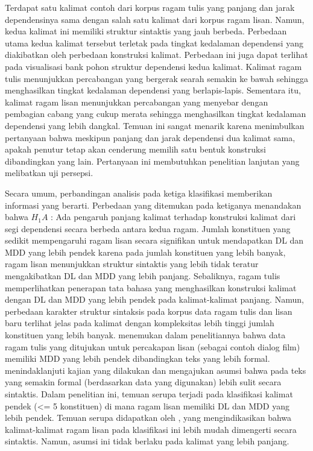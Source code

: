 Terdapat satu kalimat contoh dari korpus ragam tulis yang panjang dan jarak dependensinya sama dengan salah satu kalimat dari korpus ragam lisan. Namun, kedua kalimat ini memiliki struktur sintaktis yang jauh berbeda. Perbedaan utama kedua kalimat tersebut terletak pada tingkat kedalaman dependensi yang diakibatkan oleh perbedaan konstruksi kalimat. Perbedaan ini juga dapat terlihat pada visualisasi bank pohon struktur dependensi kedua kalimat. Kalimat ragam tulis menunjukkan percabangan yang bergerak searah semakin ke bawah sehingga menghasilkan tingkat kedalaman dependensi yang berlapis-lapis. Sementara itu, kalimat ragam lisan menunjukkan percabangan yang menyebar dengan pembagian cabang yang cukup merata sehingga menghasilkan tingkat kedalaman dependensi yang lebih dangkal. Temuan ini sangat menarik karena menimbulkan pertanyaan bahwa meskipun panjang dan jarak dependensi dua kalimat sama, apakah penutur tetap akan cenderung memilih satu bentuk konstruksi dibandingkan yang lain. Pertanyaan ini membutuhkan penelitian lanjutan yang melibatkan uji persepsi.

Secara umum, perbandingan analisis pada ketiga klasifikasi memberikan informasi yang berarti. Perbedaan yang ditemukan pada ketiganya menandakan bahwa $H_{1}A$ : Ada pengaruh panjang kalimat terhadap konstruksi kalimat dari segi dependensi secara berbeda antara kedua ragam. Jumlah konstituen yang sedikit mempengaruhi ragam lisan secara signifikan untuk mendapatkan DL dan MDD yang lebih pendek karena pada jumlah konstituen yang lebih banyak, ragam lisan menunjukkan struktur sintaktis yang lebih tidak teratur mengakibatkan DL dan MDD yang lebih panjang. Sebaliknya, ragam tulis memperlihatkan penerapan tata bahasa yang menghasilkan konstruksi kalimat dengan DL dan MDD yang lebih pendek pada kalimat-kalimat panjang. Namun, perbedaan karakter struktur sintaksis pada korpus data ragam tulis dan lisan baru terlihat jelas pada kalimat dengan kompleksitas lebih tinggi jumlah konstituen yang lebih banyak. \cite{wang2017effects} menemukan dalam penelitiannya bahwa data ragam tulis yang ditujukan untuk percakapan lisan (sebagai contoh dialog film) memiliki MDD yang lebih pendek dibandingkan teks yang lebih formal. \cite{wang2017effects} menindaklanjuti kajian yang dilakukan \cite{hiranuma1999syntactic} dan \cite{liu2009chinese} mengajukan asumsi bahwa pada teks yang semakin formal (berdasarkan data yang digunakan) lebih sulit secara sintaktis. Dalam penelitian ini, temuan serupa terjadi pada klasifikasi kalimat pendek (\textless= 5 konstituen) di mana ragam lisan memiliki DL dan MDD yang lebih pendek. Temuan serupa didapatkan oleh \cite{wang2017effects}, yang mengindikasikan bahwa kalimat-kalimat ragam lisan pada klasifikasi ini lebih mudah dimengerti secara sintaktis. Namun, asumsi ini tidak berlaku pada kalimat yang lebih panjang. 

